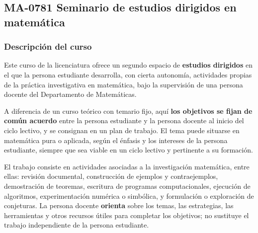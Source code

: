\newpage
\subsection*{MA-0781 Seminario de estudios dirigidos en matemática}

\hypertarget{MA0781SED}{}
\begin{refsection}
\begin{table}[H]
\end{table}

\subsubsection*{Descripción del curso}

Este curso de la licenciatura ofrece un segundo espacio de \textbf{estudios dirigidos} en el que la persona estudiante desarrolla, con cierta autonomía, actividades propias de la práctica investigativa en matemática, bajo la supervisión de una persona docente del Departamento de Matemáticas.

A diferencia de un curso teórico con temario fijo, aquí \textbf{los objetivos se fijan de común acuerdo} entre la persona estudiante y la persona docente al inicio del ciclo lectivo, y se consignan en un plan de trabajo. El tema puede situarse en matemática pura o aplicada, según el énfasis y los intereses de la persona estudiante, siempre que sea viable en un ciclo lectivo y pertinente a su formación.

El trabajo consiste en actividades asociadas a la investigación matemática, entre ellas: revisión documental, construcción de ejemplos y contraejemplos, demostración de teoremas, escritura de programas computacionales, ejecución de algoritmos, experimentación numérica o simbólica, y formulación o exploración de conjeturas. La persona docente \textbf{orienta} sobre los temas, las estrategias, las herramientas y otros recursos útiles para completar los objetivos; no sustituye el trabajo independiente de la persona estudiante.


\end{refsection}
